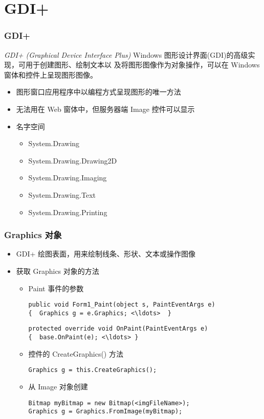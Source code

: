 
\section{GDI+}

\begin{frame}
\frametitle{GDI+}
\begin{block}{\textit{GDI+ (Graphical Device Interface Plus)}}
  \CJKindent Windows 图形设计界面(GDI)的高级实现，可用于创建图形、绘制文本以
  及将图形图像作为对象操作，可以在 Windows 窗体和控件上呈现图形图像。
\end{block}

\begin{itemize}
\item 图形窗口应用程序中以编程方式呈现图形的唯一方法
\item 无法用在 Web 窗体中，但服务器端 Image 控件可以显示
\item 名字空间

\begin{itemize}
\item System.Drawing 
\item System.Drawing.Drawing2D
\item System.Drawing.Imaging
\item System.Drawing.Text
\item System.Drawing.Printing
\end{itemize}
\end{itemize}
\end{frame}

\begin{frame}[fragile]
\frametitle{Graphics 对象}
\begin{itemize}
\item GDI+ 绘图表面，用来绘制线条、形状、文本或操作图像
\item 获取 Graphics 对象的方法
\begin{itemize}
\item Paint 事件的参数
\begin{lstlisting}[escapeinside=<>]
public void Form1_Paint(object s, PaintEventArgs e) 
{  Graphics g = e.Graphics; <\ldots>  }
\end{lstlisting}
\begin{lstlisting}[escapeinside=<>]
protected override void OnPaint(PaintEventArgs e)
{  base.OnPaint(e); <\ldots> }
\end{lstlisting}
\item 控件的 CreateGraphics() 方法
\begin{lstlisting}
Graphics g = this.CreateGraphics();
\end{lstlisting}
\item 从 Image 对象创建
\begin{lstlisting}[escapeinside=<>]
Bitmap myBitmap = new Bitmap(<imgFileName>);
Graphics g = Graphics.FromImage(myBitmap);
\end{lstlisting}
\end{itemize}
\end{itemize}
\end{frame}



